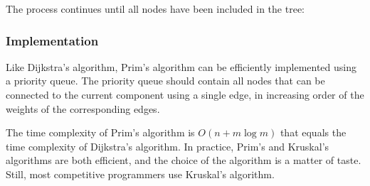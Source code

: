 \begin{samepage}
The process continues until all nodes have been included in the tree:
\begin{center}
\end{center}
\end{samepage}

\subsubsection{Implementation}

Like Dijkstra's algorithm, Prim's algorithm can be
efficiently implemented using a priority queue.
The priority queue should contain all nodes
that can be connected to the current component using
a single edge, in increasing order of the weights
of the corresponding edges.

The time complexity of Prim's algorithm is
$O(n + m \log m)$ that equals the time complexity
of Dijkstra's algorithm.
In practice, Prim's and Kruskal's algorithms
are both efficient, and the choice of the algorithm
is a matter of taste.
Still, most competitive programmers use Kruskal's algorithm.